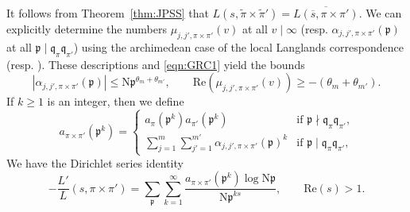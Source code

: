 \documentclass[12pt,reqno]{amsart}
\theoremstyle{remark}
\newcommand{\N}{\mathrm{N}}
\newcommand{\kp}{\mathfrak{p}}
\newcommand{\kq}{\mathfrak{q}}
\numberwithin{equation}{section}
\begin{document}
    It follows from Theorem~\ref{thm:JPSS} that $L(s,\widetilde{\pi}\times\widetilde{\pi}')=\overline{L(\overline{s},\pi\times\pi')}.$ We can explicitly determine the numbers $\mu_{j,j',\pi\times\pi'}(v)$ at all $v\mid\infty$ (resp. $\alpha_{j,j',\pi\times\pi'}(\kp)$ at all $\kp  \mid \kq_{\pi}\kq_{\pi'}$) using the archimedean case of the local Langlands correspondence \cite[Section 3.1]{MS} (resp. \cite[Appendix]{ST}).  These descriptions and \eqref{eqn:GRC1} yield the bounds
	\begin{equation}
		\label{eqn:GRC2}
	|\alpha_{j,j',\pi\times\pi'}(\kp)|\leq  \N\kp^{\theta_m+\theta_{m'}},\qquad \mathrm{Re}(\mu_{j,j',\pi\times\pi'}(v))\geq -(\theta_m+\theta_{m'}).
	\end{equation}
	If $k \geq 1$ is an integer, then we define
	\begin{equation}
	\label{eq:a-rankin-selberg}
	a_{\pi\times\pi'}(\kp^{k})= \begin{cases}
 	a_{\pi}(\kp^{k})a_{\pi'}(\kp^{k})&\mbox{if $\kp  \nmid \kq_{\pi}\kq_{\pi'}$,}\\
 	\sum_{j=1}^m \sum_{j'=1}^{m'}\alpha_{j,j',\pi\times\pi'}(\kp)^{k}&\mbox{if $\kp  \mid \kq_{\pi}\kq_{\pi'}$,}
 \end{cases}%
	\end{equation}
	We have the Dirichlet series identity
	\begin{equation}
		\label{eqn:log_deriv}
	-\frac{L'}{L}(s,\pi\times\pi')=\sum_{\kp}\sum_{k=1}^{\infty}\frac{a_{\pi\times\pi'}(\kp^{k})\log \N\kp}{\N\kp^{k s}},\qquad\mathrm{Re}(s)>1.
	\end{equation}
    
\end{document}
